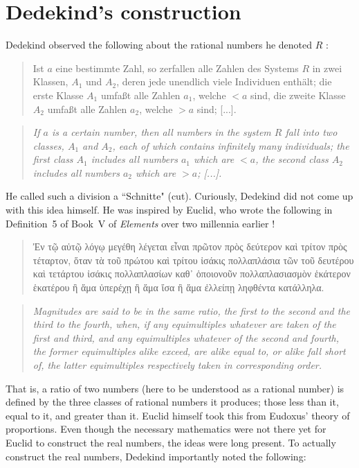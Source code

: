 \documentclass[../main.tex]{subfiles}
\begin{document}
\section{Dedekind's construction}\label{sec:the_real_numbers:dedekinds_construction}
Dedekind observed the following about the rational numbers he denoted $R$ \cite{Dedekind1872}:
\begin{quote}
    \textgerman{Ist $a$ eine bestimmte Zahl, so zerfallen alle Zahlen des Systems $R$ in zwei Klassen, $A_1$ und $A_2$, deren jede unendlich viele Individuen enthält; die erste Klasse $A_1$ umfaßt alle Zahlen $a_1$, welche $<a$ sind, die zweite Klasse $A_2$ umfaßt alle Zahlen $a_2$, welche $>a$ sind; [...].}
\end{quote}
\begin{quote}
    \textit{If $a$ is a certain number, then all numbers in the system $R$ fall into two classes, $A_1$ and $A_2$, each of which contains infinitely many individuals; the first class $A_1$ includes all numbers $a_1$ which are $<a$, the second class $A_2$ includes all numbers $a_2$ which are $>a$; [...].}
\end{quote}
He called such a division a ``\textgerman{Schnitte}" (cut). Curiously, Dedekind did not come up with this idea himself. He was inspired by Euclid, who wrote the following in Definition~5 of Book~V of \textit{Elements} over two millennia earlier \cite{Heath1926}!
\begin{quote}
    \textgreek{Ἐν τῷ αὐτῷ λόγῳ μεγέθη λέγεται εἶναι πρῶτον πρὸς δεύτερον καὶ τρίτον πρὸς τέταρτον, ὅταν τὰ τοῦ πρώτου καὶ τρίτου ἰσάκις πολλαπλάσια τῶν τοῦ δευτέρου καὶ τετάρτου ἰσάκις πολλαπλασίων καθ᾽ ὁποιονοῦν πολλαπλασιασμὸν ἑκάτερον ἑκατέρου ἢ ἅμα ὑπερέχῃ ἢ ἅμα ἴσα ἢ ἅμα ἐλλείπῃ ληφθέντα κατάλληλα.}
\end{quote}
\begin{quote}
    \textit{Magnitudes are said to be in the same ratio, the first to the second and the third to the fourth, when, if any equimultiples whatever are taken of the first and third, and any equimultiples whatever of the second and fourth, the former equimultiples alike exceed, are alike equal to, or alike fall short of, the latter equimultiples respectively taken in corresponding order.}
\end{quote}
That is, a ratio of two numbers (here to be understood as a rational number) is defined by the three classes of rational numbers it produces; those less than it, equal to it, and greater than it. Euclid himself took this from Eudoxus' theory of proportions. Even though the necessary mathematics were not there yet for Euclid to construct the real numbers, the ideas were long present. To actually construct the real numbers, Dedekind importantly noted the following:
\end{document}
